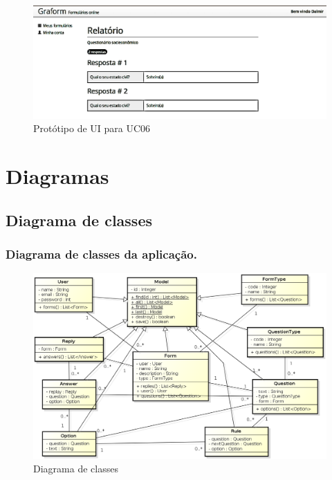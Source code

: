 \documentclass[11pt]{article}
\begin{document}
        \begin{figure}[h!]
          \centering
          \includegraphics[width=.9\textwidth]{view_report.png}
          \caption{Protótipo de UI para UC06}
        \end{figure}
        
  \clearpage
      
  \section{Diagramas}
  
    \subsection{Diagrama de classes}
    
      \subsubsection{Diagrama de classes da aplicação.}

        \begin{figure}[h!]
          \centering
          \includegraphics[width=1.0\textwidth]{class_diagram.png}
          \caption{Diagrama de classes}
        \end{figure}
        
\end{document}
